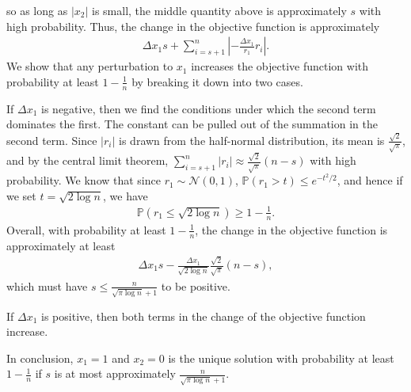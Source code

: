\documentclass[a4paper,12pt]{article}
\theoremstyle{remark}
\begin{document}
    so as long as $|x_2|$ is small, the middle quantity above is approximately $s$ with high probability. Thus, the change in the objective function is approximately
    \begin{align*}
        \Delta x_1 s + \sum_{i = s + 1}^n \left| {-\frac{\Delta x_1}{r_1}} r_i \right|.
    \end{align*}
    We show that any perturbation to $x_1$ increases the objective function with probability at least $1 - \frac{1}{n}$ by breaking it down into two cases. \par
    If $\Delta x_1$ is negative, then we find the conditions under which the second term dominates the first. The constant can be pulled out of the summation in the second term. Since $|r_i|$ is drawn from the half-normal distribution, its mean is $\frac{\sqrt{2}}{\sqrt{\pi}}$, and by the central limit theorem, $\sum_{i = s + 1}^n |r_i| \approx \frac{\sqrt{2}}{\sqrt{\pi}}(n - s)$ with high probability. We know that since $r_1 \sim \mathcal{N}(0, 1)$, $\mathbb{P}(r_1 > t) \leq e^{-t^2/2}$, and hence if we set $t = \sqrt{2\log n}$, we have
    \begin{align*}
        \mathbb{P}(r_1 \leq \sqrt{2\log n}) \geq 1 - \frac{1}{n}.
    \end{align*}
    Overall, with probability at least $1 - \frac{1}{n}$, the change in the objective function is approximately at least
    \begin{align*}
        \Delta x_1 s - \frac{\Delta x_1}{\sqrt{2\log n}} \frac{\sqrt{2}}{\sqrt{\pi}}(n - s),
    \end{align*}
    which must have $s \leq \frac{n}{\sqrt{\pi \log n} + 1}$ to be positive. \par
    If $\Delta x_1$ is positive, then both terms in the change of the objective function increase. \par
    In conclusion, $x_1 = 1$ and $x_2 = 0$ is the unique solution with probability at least $1 - \frac{1}{n}$ if $s$ is at most approximately $\frac{n}{\sqrt{\pi \log n} + 1}$.
\end{document}
